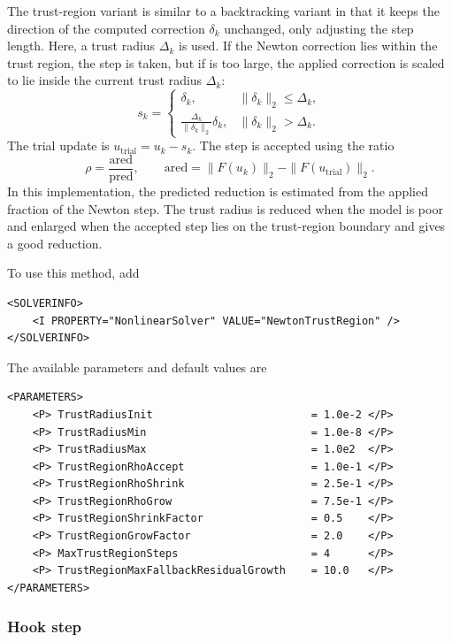 The trust-region variant is similar to a backtracking variant in that it keeps the direction of the computed correction $\delta_k$ unchanged, only adjusting the step length.
Here, a trust radius $\Delta_k$ is used. If the Newton correction lies within the trust region, the step is taken, but if is too large, the applied correction is scaled to lie inside the current trust radius $\Delta_k$:
$$
    s_k =
    \begin{cases}
    \delta_k, & \|\delta_k\|_2 \leq \Delta_k, \\
    \displaystyle \frac{\Delta_k}{\|\delta_k\|_2}\delta_k,
    & \|\delta_k\|_2 > \Delta_k.
    \end{cases}
$$
The trial update is $u_{\mathrm{trial}} = u_k - s_k$. The step is accepted
using the ratio
$$
    \rho =
    \frac{\mathrm{ared}}{\mathrm{pred}},
    \qquad
    \mathrm{ared}
    =
    \|F(u_k)\|_2 - \|F(u_{\mathrm{trial}})\|_2.
$$
In this implementation, the predicted reduction is estimated from the applied
fraction of the Newton step. The trust radius is reduced when the model is poor
and enlarged when the accepted step lies on the trust-region boundary and gives
a good reduction.

To use this method, add
\begin{lstlisting}[style=XMLStyle]
<SOLVERINFO>
    <I PROPERTY="NonlinearSolver" VALUE="NewtonTrustRegion" />
</SOLVERINFO>
\end{lstlisting}

The available parameters and default values are
\begin{lstlisting}[style=XMLStyle]
<PARAMETERS>
    <P> TrustRadiusInit                         = 1.0e-2 </P>
    <P> TrustRadiusMin                          = 1.0e-8 </P>
    <P> TrustRadiusMax                          = 1.0e2  </P>
    <P> TrustRegionRhoAccept                    = 1.0e-1 </P>
    <P> TrustRegionRhoShrink                    = 2.5e-1 </P>
    <P> TrustRegionRhoGrow                      = 7.5e-1 </P>
    <P> TrustRegionShrinkFactor                 = 0.5    </P>
    <P> TrustRegionGrowFactor                   = 2.0    </P>
    <P> MaxTrustRegionSteps                     = 4      </P>
    <P> TrustRegionMaxFallbackResidualGrowth    = 10.0   </P>
</PARAMETERS>
\end{lstlisting}

\subsubsection{Hook step}

